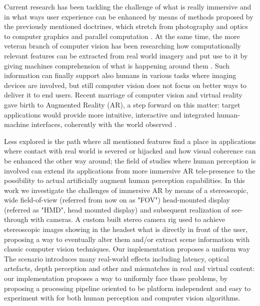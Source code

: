 Current research has been tackling the challenge of what is really immersive and in what ways user experience can be enhanced by means of methods proposed by the previously mentioned doctrines, which stretch from photography and optics \cite{immersivity_film} to computer graphics and parallel computation \cite{immersivity_3D}. At the same time, the more veteran branch of computer vision has been researching how computationally relevant features can be extracted from real world imagery and put use to it by giving machines comprehension of what is happening around them \cite{book_cv}. Such information can finally support also humans in various tasks where imaging devices are involved, but still computer vision does not focus on better ways to deliver it to end users. Recent marriage of computer vision and virtual reality gave birth to Augmented Reality (AR), a step forward on this matter: target applications would provide more intuitive, interactive and integrated human-machine interfaces, coherently with the world observed \cite{ar_intro}.

Less explored is the path where all mentioned features find a place in applications where contact with real world is severed or hijacked and how visual coherence can be enhanced the other way around; the field of studies where human perception is involved can extend its applications from more immersive AR tele-presence \cite{telepresence_intro} to the possibility to actual artificially augment human perception capabilities. In this work we investigate the challenges of immersive AR by means of a stereoscopic, wide field-of-view (referred from now on as "FOV") head-mounted display (referred as "HMD", head mounted display) and subsequent realization of see-through with cameras. A custom built stereo camera rig used to achieve stereoscopic images showing in the headset what is directly in front of the user, proposing a way to eventually alter them and/or extract scene information with classic computer vision techniques. Our implementation proposes a uniform way The scenario introduces many real-world effects including latency, optical artefacts, depth perception and other and mismatches in real and virtual content: our implementation proposes a way to uniformly face those problems, by proposing a processing pipeline oriented to be platform independent and easy to experiment with for both human perception and computer vision algorithms.


